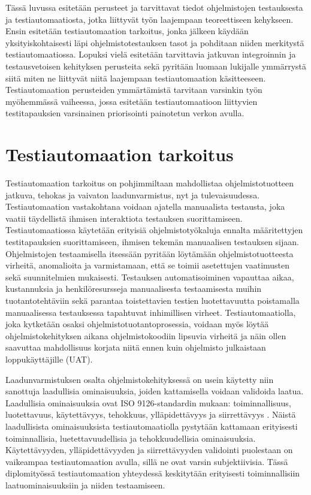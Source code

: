 Tässä luvussa esitetään perusteet ja tarvittavat tiedot ohjelmistojen testauksesta ja testiautomaatiosta, jotka liittyvät työn laajempaan teoreettiseen kehykseen.
Ensin esitetään testiautomaation tarkoitus, jonka jälkeen käydään yksityiskohtaisesti läpi ohjelmistotestauksen tasot ja pohditaan niiden merkitystä testiautomaatiossa.
Lopuksi vielä esitetään tarvittavia jatkuvan integroinnin ja testausvetoisen kehityksen perusteita sekä pyritään luomaan lukijalle ymmärrystä siitä miten ne liittyvät niitä laajempaan testiautomaation käsitteeseen.
Testiautomaation perusteiden ymmärtämistä tarvitaan varsinkin työn myöhemmässä vaiheessa, jossa esitetään testiautomaatioon liittyvien testitapauksien varsinainen priorisointi painotetun verkon avulla.

\section{Testiautomaation tarkoitus} \label{ch:07_testiautomaation_tarkoitus}

  Testiautomaation tarkoitus on pohjimmiltaan mahdollistaa ohjelmistotuotteen jatkuva, tehokas ja vaivaton laadunvarmistus, nyt ja tulevaisuudessa.
  Testiautomaation vastakohtana voidaan ajatella manuaalista testausta, joka vaatii täydellistä ihmisen interaktiota testauksen suorittamiseen.
  Testiautomaatiossa käytetään erityisiä ohjelmistotyökaluja ennalta määritettyjen testitapauksien suorittamiseen, ihmisen tekemän manuaalisen testauksen sijaan.
  Ohjelmistojen testaamisella itsessään pyritään löytämään ohjelmistotuotteesta virheitä, anomalioita ja varmistamaan, että se toimii asetettujen vaatimusten sekä suunnitelmien mukaisesti.
  Testauksen automatisoiminen vapauttaa aikaa, kustannuksia ja henkilöresursseja manuaalisesta testaamisesta muihin tuotantotehtäviin sekä parantaa toistettavien testien luotettavuutta poistamalla manuaalisessa testauksessa tapahtuvat inhimillisen virheet.
  Testiautomaatiolla, joka kytketään osaksi ohjelmistotuotantoprosessia, voidaan myös löytää ohjelmistokehityksen aikana ohjelmistokoodiin lipsuvia virheitä ja näin ollen saavuttaa mahdollisuus korjata niitä ennen kuin ohjelmisto julkaistaan loppukäyttäjille (UAT).

  Laadunvarmistuksen osalta ohjelmistokehityksessä on usein käytetty niin sanottuja laadullisia ominaisuuksia, joiden kattamisella voidaan validoida laatua.
  Laadullisia ominaisuuksia ovat ISO 9126-standardin mukaan: toiminnallisuus, luotettavuus, käytettävyys, tehokkuus, ylläpidettävyys ja siirrettävyys \parencite{iso_9126-1_2001}.
  Näistä laadullisista ominaisuuksista testiautomaatiolla pystytään kattamaan erityisesti toiminnallisia, luetettavuudellisia ja tehokkuudellisia ominaisuuksia.
  Käytettävyyden, ylläpidettävyyden ja siirrettävyyden validointi puolestaan on vaikeampaa testiautomaation avulla, sillä ne ovat varsin subjektiivisia.
  Tässä diplomityössä testiautomaation yhteydessä keskitytään erityisesti toiminnallisiin laatuominaisuuksiin ja niiden testaamiseen.

